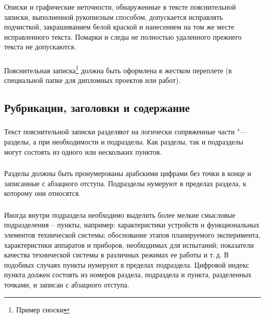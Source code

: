 \subsubsection{} 
Описки и графические неточности, обнаруженные в тексте пояснительной записки, выполненной рукописным способом, допускается исправлять подчисткой, закрашиванием белой краской и нанесением на том же месте исправленного текста. Помарки и следы не полностью удаленного прежнего текста не допускаются.

\subsubsection{} 
Пояснительная записка\footnote{Пример сноски} должна быть оформлена в жестком переплете (в специальной папке для дипломных проектов или работ).


\subsection{Рубрикации, заголовки и содержание}

\subsubsection{} 
Текст пояснительной записки разделяют на логически сопряженные части "--- разделы, а при необходимости и подразделы. Как разделы, так и подразделы могут состоять из одного или нескольких пунктов.

\subsubsection{}
Разделы должны быть пронумерованы арабскими цифрами без точки  в конце  и записанные с абзацного отступа. Подразделы 
нумеруют в пределах раздела, к которому они относятся.

\subsubsection{}
Иногда внутри подраздела необходимо выделить более мелкие смысловые подразделения – пункты, например: характеристики устройств и функциональных элементов технической системы; обоснование этапов планируемого эксперимента, характеристики аппаратов и приборов, необходимых для испытаний; показатели качества технической системы в различных режимах ее работы и т.\,д. В подобных случаях пункты нумеруют в пределах подраздела. Цифровой индекс пункта должен состоять из номеров раздела, подраздела и пункта, разделенных точками, и записан с абзацного отступа. 

